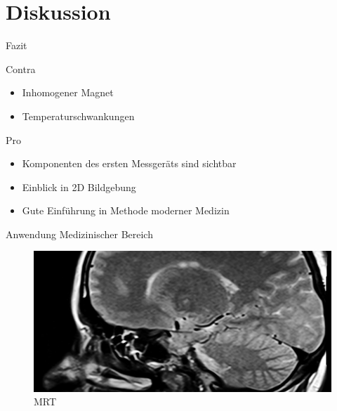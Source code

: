 \section{Diskussion}
\begin{frame}{Fazit}
	\begin{alertblock}{Contra}
	\begin{itemize}
	\item Inhomogener Magnet
	\item Temperaturschwankungen
	\end{itemize}
	\end{alertblock}
	\begin{exampleblock}{Pro}
	\begin{itemize}
	\item Komponenten des ersten Messgeräts sind sichtbar
	\item Einblick in 2D Bildgebung 
	\item Gute Einführung in Methode moderner Medizin
	\end{itemize}
	\end{exampleblock}
\end{frame}

\begin{frame}{Anwendung}
Medizinischer Bereich
	\begin{figure}
	\centering
	\includegraphics[scale=.35]{images//mrt.jpg}
	\caption{MRT}
	\end{figure}
\end{frame}